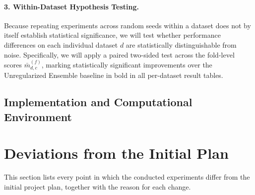 \documentclass[11pt, a4paper]{article}
\begin{document}
\paragraph{3. Within-Dataset Hypothesis Testing.}
Because repeating experiments across random seeds within a dataset does not by itself establish statistical significance, we will test whether performance differences on each individual dataset $d$ are statistically distinguishable from noise. Specifically, we will apply a paired two-sided test across the fold-level scores $\bar{m}_{d,c}^{(f)}$, marking statistically significant improvements over the Unregularized Ensemble baseline in bold in all per-dataset result tables.


\subsection{Implementation and Computational Environment}

\section{Deviations from the Initial Plan}
\label{sec:deviations}
This section lists every point in which the conducted experiments differ from the initial project plan, together with the reason for each change.
\end{document}
